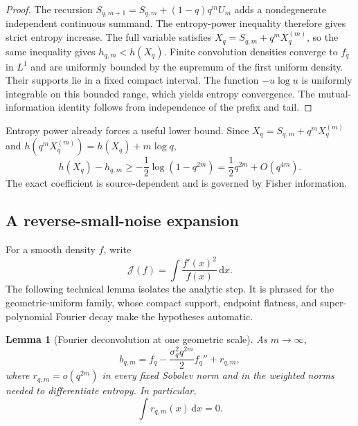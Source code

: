 \documentclass[11pt,oneside]{article}
\newtheorem{lemma}[theorem]{Lemma}
\theoremstyle{definition}
\theoremstyle{remark}
\newcommand{\dd}{\,\mathrm d}
\begin{document}
\begin{proof}
The recursion
$S_{q,m+1}=S_{q,m}+(1-q)q^mU_m$ adds a nondegenerate independent continuous
summand.  The entropy-power inequality therefore gives strict entropy increase.
The full variable satisfies $X_q=S_{q,m}+q^mX_q^{(m)}$, so the same inequality
gives $h_{q,m}<h(X_q)$.  Finite convolution densities converge to $f_q$ in
$L^1$ and are uniformly bounded by the supremum of the first uniform density.
Their supports lie in a fixed compact interval.  The function $-u\log u$ is
uniformly integrable on this bounded range, which yields entropy convergence.
The mutual-information identity follows from independence of the prefix and tail.
\end{proof}

Entropy power already forces a useful lower bound.  Since
$X_q=S_{q,m}+q^mX_q^{(m)}$ and $h(q^mX_q^{(m)})=h(X_q)+m\log q$,
\begin{equation}
 h(X_q)-h_{q,m}
 \ge-\frac12\log(1-q^{2m})
 =\frac12q^{2m}+O(q^{4m}).
 \label{eq:EPI-gap}
\end{equation}
The exact coefficient is source-dependent and is governed by Fisher information.

\subsection{A reverse-small-noise expansion}

For a smooth density $f$, write
\begin{equation}
 \mathcal J(f)=\int\frac{f'(x)^2}{f(x)}\dd x.
 \label{eq:Fisher-def}
\end{equation}
The following technical lemma isolates the analytic step.  It is phrased for the
geometric-uniform family, whose compact support, endpoint flatness, and
super-polynomial Fourier decay make the hypotheses automatic.

\begin{lemma}[Fourier deconvolution at one geometric scale]
\label{lem:deconvolution}
As $m\to\infty$,
\begin{equation}
 b_{q,m}
 =f_q-\frac{\sigma_q^2q^{2m}}2f_q''+r_{q,m},
 \label{eq:density-deconvolution}
\end{equation}
where $r_{q,m}=o(q^{2m})$ in every fixed Sobolev norm and in the weighted norms
needed to differentiate entropy.  In particular,
\begin{equation}
 \int r_{q,m}(x)\dd x=0.
 \label{eq:remainder-mass}
\end{equation}
\end{lemma}
\end{document}
